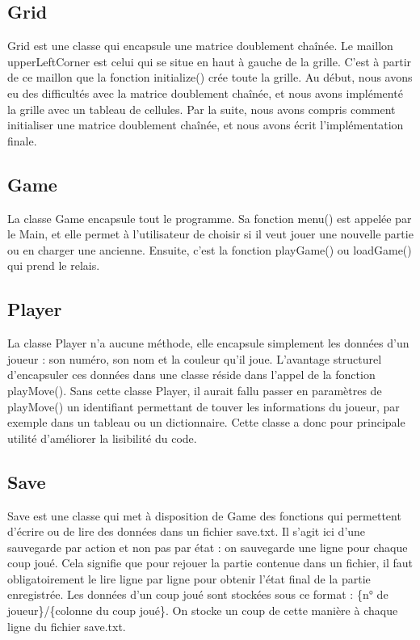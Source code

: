 \documentclass{article}
\begin{document}
\subsection{Grid}

Grid est une classe qui encapsule une matrice doublement chaînée.
Le maillon upperLeftCorner est celui qui se situe en haut à gauche de la grille. C'est à partir de ce maillon que la fonction
initialize() crée toute la grille. Au début, nous avons eu des difficultés avec la matrice doublement chaînée, et nous avons implémenté
la grille avec un tableau de cellules. Par la suite, nous avons compris comment initialiser une matrice doublement chaînée, et nous avons
écrit l'implémentation finale.

\subsection{Game}

La classe Game encapsule tout le programme. Sa fonction menu() est appelée par le Main, et elle permet à l'utilisateur de choisir si
il veut jouer une nouvelle partie ou en charger une ancienne. Ensuite, c'est la fonction playGame() ou loadGame() qui prend le relais.

\subsection{Player}

La classe Player n'a aucune méthode, elle encapsule simplement les données d'un joueur : son numéro, son nom et la couleur qu'il joue.
L'avantage structurel d'encapsuler ces données dans une classe réside dans l'appel de la fonction playMove(). Sans cette classe Player, 
il aurait fallu passer en paramètres de playMove() un identifiant permettant de touver les informations du joueur, par exemple dans un
tableau ou un dictionnaire. Cette classe a donc pour principale utilité d'améliorer la lisibilité du code.

\subsection{Save}

Save est une classe qui met à disposition de Game des fonctions qui permettent d'écrire ou de lire des données dans un fichier save.txt.
Il s'agit ici d'une sauvegarde par action et non pas par état : on sauvegarde une ligne pour chaque coup joué. Cela signifie que pour 
rejouer la partie contenue dans un fichier, il faut obligatoirement le lire ligne par ligne pour obtenir l'état final de la partie
enregistrée. Les données d'un coup joué sont stockées sous ce format : \{n° de joueur\}/\{colonne du coup joué\}. On stocke un coup de
cette manière à chaque ligne du fichier save.txt.
\end{document}
